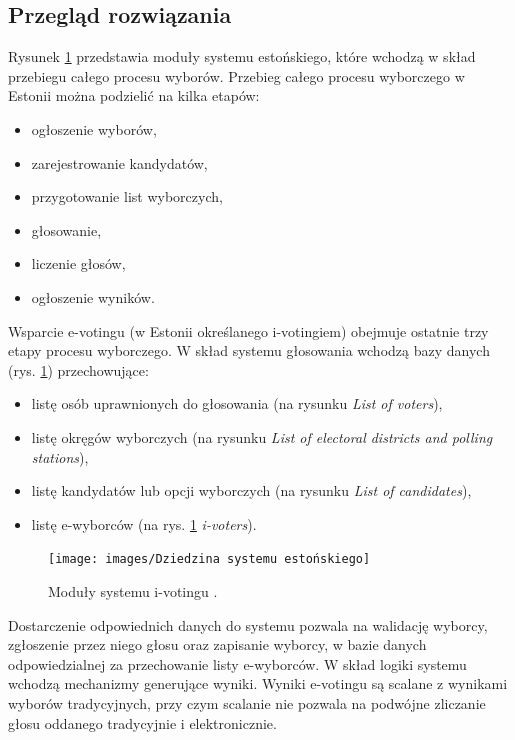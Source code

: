 \documentclass[a4paper,12pt]{book}
\begin{document}
\subsection{Przegląd rozwiązania}
Rysunek \ref{estmodules} przedstawia moduły systemu estońskiego, które wchodzą w skład przebiegu całego procesu wyborów. Przebieg całego procesu wyborczego w Estonii można podzielić na kilka etapów:
\begin{itemize}
\item ogłoszenie wyborów,
\item zarejestrowanie kandydatów,
\item przygotowanie list wyborczych,
\item głosowanie,
\item liczenie głosów,
\item ogłoszenie wyników.
\end{itemize}

Wsparcie e-votingu (w Estonii określanego i-votingiem) obejmuje ostatnie trzy etapy procesu wyborczego.
\newline
\newline
W skład systemu głosowania wchodzą bazy danych (rys. \ref{estmodules}) przechowujące:
\begin{itemize}
\item listę osób uprawnionych do głosowania (na rysunku \textit{List of voters}),
\item listę okręgów wyborczych (na rysunku \textit{List of electoral districts and polling stations}),
\item listę kandydatów lub opcji wyborczych (na rysunku \textit{List of candidates}),
\item listę e-wyborców (na rys. \ref{estmodules} \textit{i-voters}).
\end{itemize}

\begin{figure}[h]
	\centering
	\texttt{[image: images/Dziedzina systemu estońskiego]}
	\caption{Moduły systemu i-votingu \cite{estonian:voting}.}\label{estmodules}
\end {figure}

Dostarczenie odpowiednich danych do systemu pozwala na walidację wyborcy, zgłoszenie przez
niego głosu oraz zapisanie wyborcy, w bazie danych odpowiedzialnej za przechowanie listy e-wyborców. W skład logiki systemu wchodzą mechanizmy generujące wyniki. Wyniki e-votingu są scalane z wynikami wyborów tradycyjnych, przy czym scalanie nie pozwala na podwójne zliczanie głosu oddanego tradycyjnie i elektronicznie.
\end{document}
